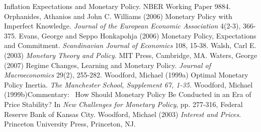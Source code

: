 \documentclass{article}
\begin{document}
\begin{doublespace}
Inflation Expectations and Monetary Policy. NBER Working Paper 9884.\bigskip 
\newline
Orphanides, Athanios and John C. Williams (2006) Monetary Policy with
Imperfect Knowledge. \textit{Journal of the European Economic Association }%
4(2-3), 366-375. \bigskip \newline
Evans, George and Seppo Honkapohja (2006) Monetary Policy, Expectations and
Commitment. \textit{Scandinavian Journal of Economics} 108, 15-38.\bigskip 
\newline
Walsh, Carl E. (2003) \textit{Monetary Theory and Policy}. MIT Press,
Cambridge, MA.\bigskip \newline
Waters, George (2007) Regime Changes, Learning and Monetary Policy. \textit{%
Journal of Macroeconomics} 29(2), 255-282.\bigskip \newline
Woodford, Michael (1999a) Optimal Monetary Policy Inertia. \textit{The
Manchester School, Supplement 67, 1-35.}\bigskip \newline
Woodford, Michael (1999b)Commentary: \ How Should Monetary Policy Be
Conducted in an Era of Price Stability? In \textit{New Challenges for
Monetary Policy}, pp. 277-316, Federal Reserve Bank of Kansas City.\bigskip 
\newline
Woodford, Michael (2003) \textit{Interest and Prices}. Princeton University
Press, Princeton, NJ.

\pagebreak

\end{doublespace}
\end{document}
